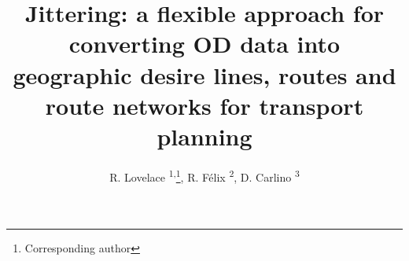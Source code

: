 \documentclass{isprs} %
\begin{document}
\title{Jittering: a flexible approach for converting OD data into geographic desire lines, routes and route networks for transport planning}
\date{}


\author{R. Lovelace \textsuperscript{1,}\thanks{Corresponding author}, R. Félix \textsuperscript{2}, D. Carlino \textsuperscript{3}}

\address{\textsuperscript{1} Institute for Transport Studies, University of Leeds, UK - r.lovelace@leeds.ac.uk}
\address{\textsuperscript{2} CERIS, Instituto Superior Técnico, University of Lisbon, Portugal - rosamfelix@tecnico.ulisboa.pt}
\address{\textsuperscript{3} Alan Turing Institute, UK - dcarlino@turing.ac.uk}



\icwg{}   %
\end{document}
